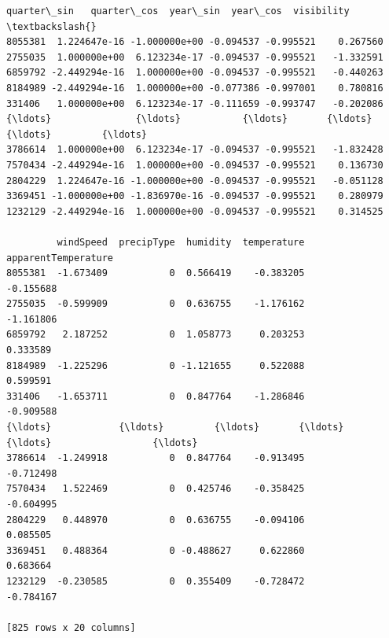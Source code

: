 \documentclass[11pt]{article}
\begin{document}
\begin{tcolorbox}[breakable, size=fbox, boxrule=.5pt, pad at break*=1mm, opacityfill=0]
\begin{Verbatim}[commandchars=\\\{\}]
          quarter\_sin   quarter\_cos  year\_sin  year\_cos  visibility  \textbackslash{}
8055381  1.224647e-16 -1.000000e+00 -0.094537 -0.995521    0.267560
2755035  1.000000e+00  6.123234e-17 -0.094537 -0.995521   -1.332591
6859792 -2.449294e-16  1.000000e+00 -0.094537 -0.995521   -0.440263
8184989 -2.449294e-16  1.000000e+00 -0.077386 -0.997001    0.780816
331406   1.000000e+00  6.123234e-17 -0.111659 -0.993747   -0.202086
{\ldots}               {\ldots}           {\ldots}       {\ldots}       {\ldots}         {\ldots}
3786614  1.000000e+00  6.123234e-17 -0.094537 -0.995521   -1.832428
7570434 -2.449294e-16  1.000000e+00 -0.094537 -0.995521    0.136730
2804229  1.224647e-16 -1.000000e+00 -0.094537 -0.995521   -0.051128
3369451 -1.000000e+00 -1.836970e-16 -0.094537 -0.995521    0.280979
1232129 -2.449294e-16  1.000000e+00 -0.094537 -0.995521    0.314525

         windSpeed  precipType  humidity  temperature  apparentTemperature
8055381  -1.673409           0  0.566419    -0.383205            -0.155688
2755035  -0.599909           0  0.636755    -1.176162            -1.161806
6859792   2.187252           0  1.058773     0.203253             0.333589
8184989  -1.225296           0 -1.121655     0.522088             0.599591
331406   -1.653711           0  0.847764    -1.286846            -0.909588
{\ldots}            {\ldots}         {\ldots}       {\ldots}          {\ldots}                  {\ldots}
3786614  -1.249918           0  0.847764    -0.913495            -0.712498
7570434   1.522469           0  0.425746    -0.358425            -0.604995
2804229   0.448970           0  0.636755    -0.094106             0.085505
3369451   0.488364           0 -0.488627     0.622860             0.683664
1232129  -0.230585           0  0.355409    -0.728472            -0.784167

[825 rows x 20 columns]
\end{Verbatim}
\end{tcolorbox}
        
\end{document}
